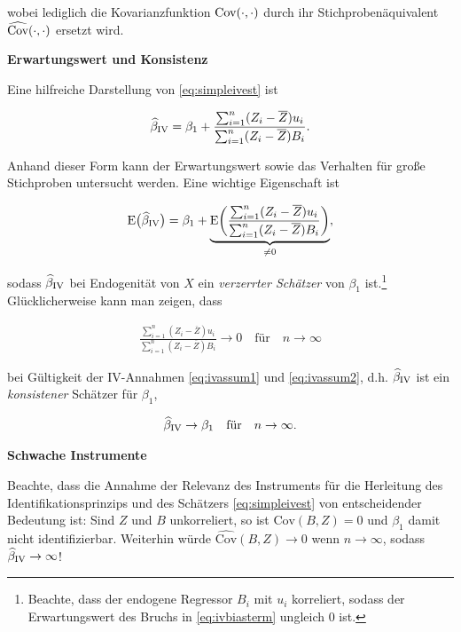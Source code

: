 \documentclass[
  a4paper,
  DIV=11,
  oneside]{scrreprt}
\begin{document}
wobei lediglich die Kovarianzfunktion \(\textup{Cov}(\cdot,\cdot)\)
durch ihr Stichprobenäquivalent \(\widehat{\textup{Cov}}(\cdot,\cdot)\)
ersetzt wird.

\textbf{Erwartungswert und Konsistenz}

Eine hilfreiche Darstellung von \eqref{eq:simpleivest} ist

\begin{align*}
  \widehat{\beta}_\textup{IV} = \beta_1 + \frac{\sum_{i=1}^n (Z_i-\overline Z) u_i}{\sum_{i=1}^n (Z_i - \overline{Z})B_i}.
\end{align*}

Anhand dieser Form kann der Erwartungswert sowie das Verhalten für große
Stichproben untersucht werden. Eine wichtige Eigenschaft ist

\begin{align}
  \textup{E}\big(\widehat{\beta}_\textup{IV}\big) = \beta_1 + \underbrace{\textup{E}\bigg(\frac{\sum_{i=1}^n (Z_i-\overline Z) u_i}{\sum_{i=1}^n (Z_i - \overline{Z})B_i}\bigg)}_{\neq0},\label{eq:ivbiasterm}
\end{align}

sodass \(\widehat{\beta}_\textup{IV}\) bei Endogenität von \(X\) ein
\emph{verzerrter Schätzer} von \(\beta_1\) ist.\footnote{Beachte, dass
  der endogene Regressor \(B_i\) mit \(u_i\) korreliert, sodass der
  Erwartungswert des Bruchs in \eqref{eq:ivbiasterm} ungleich \(0\) ist.}
Glücklicherweise kann man zeigen, dass

\begin{align*}
  \frac{\sum_{i=1}^n (Z_i-\overline Z) u_i}{\sum_{i=1}^n (Z_i - \overline{Z})B_i}\to 0 \quad \text{für} \quad n\to\infty
\end{align*}

bei Gültigkeit der IV-Annahmen \eqref{eq:ivassum1} und
\eqref{eq:ivassum2}, d.h. \(\widehat{\beta}_\textup{IV}\) ist ein
\emph{konsistener} Schätzer für \(\beta_1\),

\begin{align*}
  \widehat{\beta}_\textup{IV} \to \beta_1 \quad \text{für} \quad n\to\infty.
\end{align*}

\textbf{Schwache Instrumente}

Beachte, dass die Annahme der Relevanz des Instruments für die
Herleitung des Identifikationsprinzips und des Schätzers
\eqref{eq:simpleivest} von entscheidender Bedeutung ist: Sind \(Z\) und
\(B\) unkorreliert, so ist \(\text{Cov}(B,Z) = 0\) und \(\beta_1\) damit
nicht identifizierbar. Weiterhin würde \(\widehat{\text{Cov}}(B,Z)\to0\)
wenn \(n\to\infty\), sodass \(\widehat{\beta}_{\textup{IV}}\to\infty\)!
\end{document}
